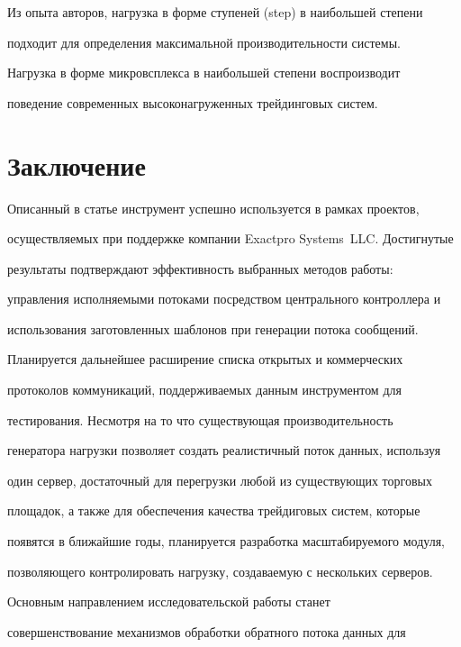   Из опыта авторов, нагрузка в форме ступеней ({\sf  step}) в наибольшей степени


подходит для определения максимальной производительности системы.


Нагрузка в форме микровсплекса в наибольшей степени воспроизводит


поведение современных высоконагруженных трейдинговых систем.





\section{Заключение}





  Описанный в статье инструмент успешно используется в рамках проектов,


осуществляемых при поддержке компании Exactpro Systems~LLC. Достигнутые


результаты подтверждают эффективность выбранных методов работы:


управления исполняемыми потоками посредством центрального контроллера и


использования заготовленных шаблонов при генерации потока сообщений.





  Планируется дальнейшее расширение списка открытых и коммерческих


протоколов коммуникаций, поддерживаемых данным инструментом для


тестирования. Несмотря на то что существующая производительность


генератора нагрузки позволяет создать реалистичный поток данных, используя


один сервер, достаточный для перегрузки любой из существующих торговых


площадок, а также для обеспечения качества трейдиговых систем, которые


появятся в ближайшие годы, планируется разработка масштабируемого модуля,


позволяющего контролировать нагрузку, создаваемую с нескольких серверов.





  Основным направлением исследовательской работы станет


совершенствование механизмов обработки обратного потока данных для


